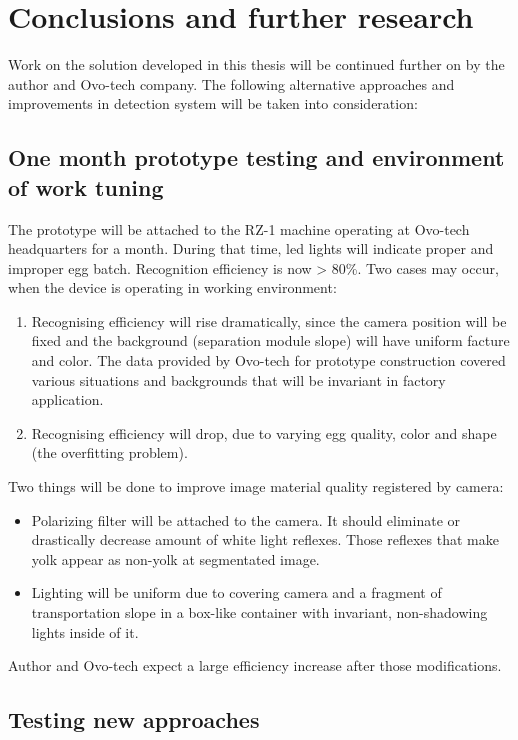 \documentclass[12pt,twoside,a4paper]{article}
\begin{document}
\newpage
\section{Conclusions and further research}

Work on the solution developed in this thesis will be continued further on by the author and Ovo-tech company.
The following alternative approaches and improvements in detection system will be taken into consideration:

\subsection{One month prototype testing and environment of work tuning}

The prototype will be attached to the RZ-1 machine operating at Ovo-tech headquarters for a month.
During that time, led lights will indicate proper and improper egg batch.
Recognition efficiency is now > 80\%. Two cases may occur, when the device is operating in working environment:
\begin{enumerate}
\item Recognising efficiency will rise dramatically, since the camera position will be fixed and the background (separation module slope) will have uniform facture and color.
The data provided by Ovo-tech for prototype construction covered various situations and backgrounds that will be invariant in factory application.
\item Recognising efficiency will drop, due to varying egg quality, color and shape (the overfitting problem).
\end{enumerate}

Two things will be done to improve image material quality registered by camera:
\begin{itemize}
\item Polarizing filter will be attached to the camera.
It should eliminate or drastically decrease amount of white light reflexes.
Those reflexes that make yolk appear as non-yolk at segmentated image.
\item Lighting will be uniform due to covering camera and a fragment of transportation slope in a box-like container with invariant, non-shadowing lights inside of it.
\end{itemize}

Author and Ovo-tech expect a large efficiency increase after those modifications.
\subsection{Testing new approaches}
\end{document}
